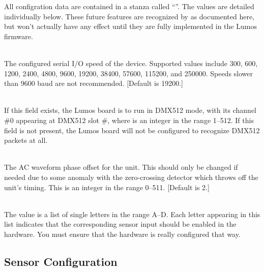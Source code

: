 All configration data are contained in a stanza called
``''.
The values are detailed individually below.
These future features are recognized by 
as documented here, but won't actually have any effect until they are fully implemented in the Lumos
firmware.
\begin{list}{}{}
\item[{\codetype{baud=}\Var*{n}}]\hfill\\
The configured serial I/O speed of the device.  Supported values include 300, 600, 1200, 2400,
4800, 9600, 19200, 38400, 57600, 115200, and 250000.  Speeds slower than 9600 baud
are not recommended. [Default is 19200.]
\item[{\codetype{dmxchannel=}\Var*{n}}]\hfill\\
If this field exists, the Lumos board is to run in DMX512 mode, with its channel \#0 appearing
at DMX512 slot 
\#,
where
is an integer in the range 1--512.
If this field is not present, the Lumos board will not be configured to recognize DMX512 packets
at all.
\item[{\codetype{phase=}\Var*{offset}}]\hfill\\
The AC waveform phase offset for the unit.  This should only be changed if needed due to some
anomaly with the zero-crossing detector which throws off the unit's timing.  This is an integer
in the range 0--511.  [Default is 2.]
\item[{\codetype{sensors=}\Var*{list}}]\hfill\\
The value is a list of single letters in the range A--D.  Each letter appearing in this
list indicates that the corresponding sensor input should be enabled in the hardware.
You must ensure that the hardware is really configured that way.  
\end{list}
\subsection*{Sensor Configuration}


